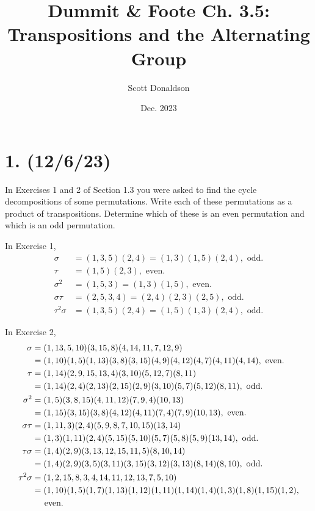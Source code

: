 \documentclass{article}
\title{Dummit \& Foote Ch. 3.5: Transpositions and the Alternating Group}
\author{Scott Donaldson}
\date{Dec. 2023}
\begin{document}
\maketitle

\section*{1. (12/6/23)}

In Exercises 1 and 2 of Section 1.3 you were asked to find the cycle decompositions of some permutations. Write each of these permutations as a product of transpositions. Determine which of these is an even permutation and which is an odd permutation.

\vspace{0.5em}
In Exercise 1,
\begin{align*}
    \sigma &= (1, 3, 5)(2, 4) = (1, 3)(1, 5)(2, 4), \text{ odd.} \\
    \tau &= (1, 5)(2, 3), \text{ even.} \\
    \sigma^2 &= (1, 5, 3) = (1, 3)(1, 5), \text{ even.} \\
    \sigma \tau &= (2, 5, 3, 4) = (2, 4)(2, 3)(2, 5), \text{ odd.} \\
    \tau^2 \sigma &= (1, 3, 5)(2, 4) = (1, 5)(1, 3)(2, 4), \text{ odd.}
\end{align*}

In Exercise 2,
\begin{align*}
    \sigma &= (1, 13, 5, 10)(3, 15, 8)(4, 14, 11, 7, 12, 9) \\ &= (1, 10)(1, 5)(1, 13)(3, 8)(3, 15)(4, 9)(4, 12)(4, 7)(4, 11)(4, 14), \text{ even.} \\
    \tau &= (1, 14)(2, 9, 15, 13, 4)(3, 10)(5, 12, 7)(8, 11) \\ &= (1, 14)(2, 4)(2, 13)(2, 15)(2, 9)(3, 10)(5, 7)(5, 12)(8, 11), \text{ odd.} \\
    \sigma^2 &= (1, 5)(3, 8, 15)(4, 11, 12)(7, 9, 4)(10, 13) \\ &= (1, 15)(3, 15)(3, 8)(4, 12)(4, 11)(7, 4)(7, 9)(10, 13), \text{ even.} \\
    \sigma \tau &= (1, 11, 3)(2, 4)(5, 9, 8, 7, 10, 15)(13, 14) \\ &= (1, 3)(1, 11)(2, 4)(5, 15)(5, 10)(5, 7)(5, 8)(5, 9)(13, 14), \text{ odd.} \\
    \tau \sigma &= (1, 4)(2, 9)(3, 13, 12, 15, 11, 5)(8, 10, 14) \\ &= (1, 4)(2, 9)(3, 5)(3, 11)(3, 15)(3, 12)(3, 13)(8, 14)(8, 10), \text{ odd.} \\
    \tau^2 \sigma &= (1, 2, 15, 8, 3, 4, 14, 11, 12, 13, 7, 5, 10) \\ &= (1, 10)(1, 5)(1, 7)(1, 13)(1, 12)(1, 11)(1, 14)(1, 4)(1, 3)(1, 8)(1, 15)(1, 2), \\ & \hspace{1.1em} \text{ even.}
\end{align*}
\end{document}
